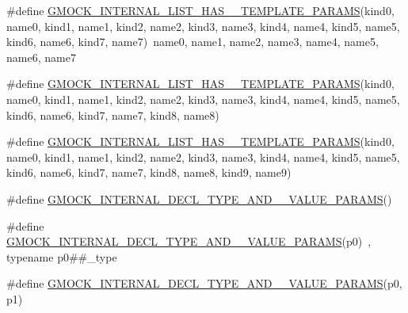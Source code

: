 \begin{DoxyCompactItemize}
\item 
\#define \mbox{\hyperlink{_obj__test_2lib_2googletest-release-1_88_81_2googlemock_2include_2gmock_2gmock-generated-actions_8h_a1080c34f9f1d183b54b4b710b5a6e98d}{G\+M\+O\+C\+K\+\_\+\+I\+N\+T\+E\+R\+N\+A\+L\+\_\+\+L\+I\+S\+T\+\_\+\+H\+A\+S\+\_\+\_\+\+T\+E\+M\+P\+L\+A\+T\+E\+\_\+\+P\+A\+R\+A\+MS}}(kind0,  name0,  kind1,  name1,  kind2,  name2,  kind3,  name3,  kind4,  name4,  kind5,  name5,  kind6,  name6,  kind7,  name7)~name0, name1, name2, name3, name4, name5, name6, name7
\item 
\#define \mbox{\hyperlink{_obj__test_2lib_2googletest-release-1_88_81_2googlemock_2include_2gmock_2gmock-generated-actions_8h_a2492e9cf6abea9975cc7703e24fb4409}{G\+M\+O\+C\+K\+\_\+\+I\+N\+T\+E\+R\+N\+A\+L\+\_\+\+L\+I\+S\+T\+\_\+\+H\+A\+S\+\_\+\_\+\+T\+E\+M\+P\+L\+A\+T\+E\+\_\+\+P\+A\+R\+A\+MS}}(kind0,  name0,  kind1,  name1,  kind2,  name2,  kind3,  name3,  kind4,  name4,  kind5,  name5,  kind6,  name6,  kind7,  name7,  kind8,  name8)
\item 
\#define \mbox{\hyperlink{_obj__test_2lib_2googletest-release-1_88_81_2googlemock_2include_2gmock_2gmock-generated-actions_8h_ab216ed7cf202e5c97e4a4e4115c416d2}{G\+M\+O\+C\+K\+\_\+\+I\+N\+T\+E\+R\+N\+A\+L\+\_\+\+L\+I\+S\+T\+\_\+\+H\+A\+S\+\_\+\_\+\+T\+E\+M\+P\+L\+A\+T\+E\+\_\+\+P\+A\+R\+A\+MS}}(kind0,  name0,  kind1,  name1,  kind2,  name2,  kind3,  name3,  kind4,  name4,  kind5,  name5,  kind6,  name6,  kind7,  name7,  kind8,  name8,  kind9,  name9)
\item 
\#define \mbox{\hyperlink{_obj__test_2lib_2googletest-release-1_88_81_2googlemock_2include_2gmock_2gmock-generated-actions_8h_a9eda3221eac423c7026d63fc486d1296}{G\+M\+O\+C\+K\+\_\+\+I\+N\+T\+E\+R\+N\+A\+L\+\_\+\+D\+E\+C\+L\+\_\+\+T\+Y\+P\+E\+\_\+\+A\+N\+D\+\_\+\_\+\+V\+A\+L\+U\+E\+\_\+\+P\+A\+R\+A\+MS}}()
\item 
\#define \mbox{\hyperlink{_obj__test_2lib_2googletest-release-1_88_81_2googlemock_2include_2gmock_2gmock-generated-actions_8h_a462396713d8024e37a66fb12abd87a00}{G\+M\+O\+C\+K\+\_\+\+I\+N\+T\+E\+R\+N\+A\+L\+\_\+\+D\+E\+C\+L\+\_\+\+T\+Y\+P\+E\+\_\+\+A\+N\+D\+\_\+\_\+\+V\+A\+L\+U\+E\+\_\+\+P\+A\+R\+A\+MS}}(p0)~, typename p0\#\#\+\_\+type
\item 
\#define \mbox{\hyperlink{_obj__test_2lib_2googletest-release-1_88_81_2googlemock_2include_2gmock_2gmock-generated-actions_8h_a8de8a9ba55313f4f4ba936c28ffe0d93}{G\+M\+O\+C\+K\+\_\+\+I\+N\+T\+E\+R\+N\+A\+L\+\_\+\+D\+E\+C\+L\+\_\+\+T\+Y\+P\+E\+\_\+\+A\+N\+D\+\_\+\_\+\+V\+A\+L\+U\+E\+\_\+\+P\+A\+R\+A\+MS}}(p0,  p1)

\end{DoxyCompactItemize}
